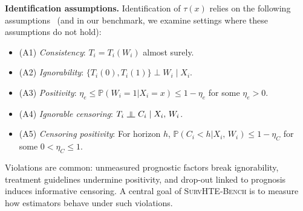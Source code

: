\documentclass{article} %
\begin{document}
\textbf{Identification assumptions.}
Identification of $\tau(x)$ relies on the following assumptions~\citep{cui2023estimating} (and in our benchmark, we examine settings where these assumptions do not hold):
\begin{itemize}[leftmargin=*, itemsep=0pt,parsep=0pt,partopsep=0pt,topsep=-3pt]
    \item (A1) \textit{Consistency}: %
    $T_i = T_i(W_i)$ almost surely.
    \item (A2) \textit{Ignorability}: %
    $\{ T_i(0), T_i(1)\} \perp W_i \mid X_i$.
    \item (A3) \textit{Positivity}: %
    $\eta_e \leq \mathbb P ({W_i = 1 | X_i=x}) \leq 1 - \eta_e$ for some $\eta_e>0$.
    \item (A4) \textit{Ignorable censoring}: %
    $T_i ~\indep~ C_i \mid X_i, \, W_i$.
    \item (A5) \textit{Censoring positivity}: For horizon $h$, 
    $\mathbb P ({C_i < h | X_i, \, W_i}) \leq 1 - \eta_C$ for some $0 < \eta_C \leq 1$.
\end{itemize}
Violations are common: unmeasured prognostic factors break ignorability, treatment guidelines undermine positivity, and drop-out linked to prognosis induces informative censoring.  
A central goal of \textsc{SurvHTE‐Bench} is to measure how estimators behave under such violations. %
\end{document}
